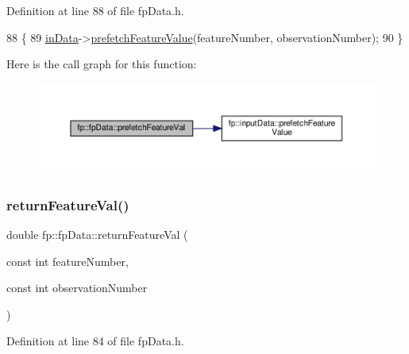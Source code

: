 Definition at line 88 of file fp\+Data.\+h.


\begin{DoxyCode}
88                                                                                                 \{
89                 \hyperlink{classfp_1_1fpData_a49d7c3f58bcf88843c25b1b0c9714ebe}{inData}->\hyperlink{classfp_1_1inputData_a348baff7c24d263bb24185dbaa19d455}{prefetchFeatureValue}(featureNumber, observationNumber);
90             \}
\end{DoxyCode}
Here is the call graph for this function\+:
\nopagebreak
\begin{figure}[H]
\begin{center}
\leavevmode
\includegraphics[width=350pt]{classfp_1_1fpData_a3f9645ca93e9b64a788b3042e9e41fcc_cgraph}
\end{center}
\end{figure}
\mbox{\label{classfp_1_1fpData_a6b359086ec1e5c534095600e2ed5575f}} 
\subsubsection{\texorpdfstring{return\+Feature\+Val()}{returnFeatureVal()}}
{\footnotesize\ttfamily double fp\+::fp\+Data\+::return\+Feature\+Val (\begin{DoxyParamCaption}\item[{const int}]{feature\+Number,  }\item[{const int}]{observation\+Number }\end{DoxyParamCaption})\hspace{0.3cm}{\ttfamily [inline]}}



Definition at line 84 of file fp\+Data.\+h.


